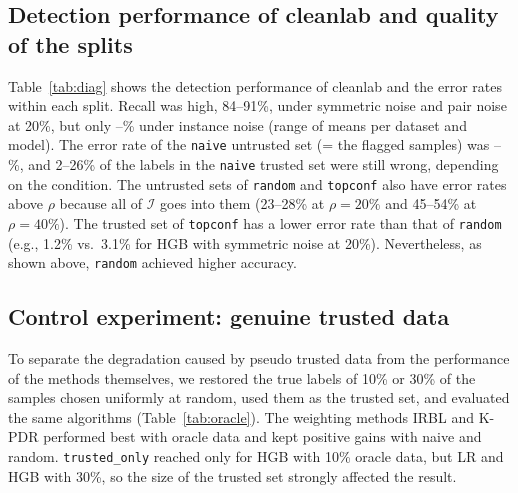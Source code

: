 \documentclass[a4paper,10pt]{article}
\newcommand{\method}[1]{\texttt{#1}}
\newcommand{\cl}{\textsf{cleanlab}}
\begin{document}
\begin{table}[tbp]
  \centering
  \caption{$\Delta$ by noise kind and rate (pt, mean over 3 datasets $\times$ 5 seeds). Main methods only. The first row is the accuracy of \method{baseline} (\%). All methods are listed in Table~\ref{tab:noise-all} in the appendix.}
  \label{tab:noise}
  \footnotesize
  
\end{table}

\subsection{Detection performance of \cl{} and quality of the splits}\label{sec:diag}
Table~\ref{tab:diag} shows the detection performance of \cl{} and the error rates within each split.
Recall was high, 84--91\%, under symmetric noise and pair noise at 20\%, but only \InstRecallMin--\InstRecallMax\% under instance noise (range of means per dataset and model).
The error rate of the \method{naive} untrusted set (= the flagged samples) was \NaiveUntrustedMin--\NaiveUntrustedMax\%, and 2--26\% of the labels in the \method{naive} trusted set were still wrong, depending on the condition.
The untrusted sets of \method{random} and \method{topconf} also have error rates above $\rho$ because all of $\mathcal{I}$ goes into them (23--28\% at $\rho = 20\%$ and 45--54\% at $\rho = 40\%$).
The trusted set of \method{topconf} has a lower error rate than that of \method{random} (e.g., 1.2\% vs.\ 3.1\% for HGB with symmetric noise at 20\%).
Nevertheless, as shown above, \method{random} achieved higher accuracy.

\begin{table}[tbp]
  \centering
  \caption{Detection performance of \cl{} and error rates of the pseudo splits (\%, mean over 3 datasets $\times$ 5 seeds). Flagged is the fraction of samples flagged as errors. T is trusted and U is untrusted. For \method{naive}, $\mathcal{U} = \mathcal{I}$, so the error rate of naive U equals the precision, and the size of naive T is 1 $-$ the flagged fraction.}
  \label{tab:diag}
  \footnotesize
  \setlength{\tabcolsep}{3.5pt}
  
\end{table}

\subsection{Control experiment: genuine trusted data}\label{sec:oracle}
To separate the degradation caused by pseudo trusted data from the performance of the methods themselves, we restored the true labels of 10\% or 30\% of the samples chosen uniformly at random, used them as the trusted set, and evaluated the same algorithms (Table~\ref{tab:oracle}).
The weighting methods IRBL and K-PDR performed best with oracle data and kept positive gains with naive and random.
\method{trusted\_only} reached only \OHGBTRUSTEDONLYTen{} for HGB with 10\% oracle data, but LR \OLRTRUSTEDONLYThirty{} and HGB \OHGBTRUSTEDONLYThirty{} with 30\%, so the size of the trusted set strongly affected the result.
\end{document}
